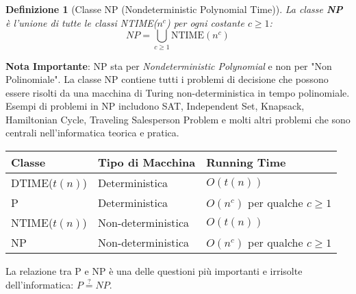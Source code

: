 \documentclass[a4paper]{article}
\newtheorem{definition}{Definizione}[section]
\begin{document}
\begin{definition}[Classe NP (Nondeterministic Polynomial Time)]
La classe \textbf{NP} è l'unione di tutte le classi NTIME($n^c$) per ogni costante $c \ge 1$:
\[ NP = \bigcup_{c \ge 1} \text{NTIME}(n^c) \]
\end{definition}
\textbf{Nota Importante}: NP sta per \emph{Nondeterministic Polynomial} e non per "Non Polinomiale". La classe NP contiene tutti i problemi di decisione che possono essere risolti da una macchina di Turing non-deterministica in tempo polinomiale.
Esempi di problemi in NP includono SAT, Independent Set, Knapsack, Hamiltonian Cycle, Traveling Salesperson Problem e molti altri problemi che sono centrali nell'informatica teorica e pratica.

\begin{center}
\begin{tabular}{|l|l|l|}
\hline
\textbf{Classe} & \textbf{Tipo di Macchina} & \textbf{Running Time} \\
\hline
DTIME($t(n)$) & Deterministica & $O(t(n))$ \\
P & Deterministica & $O(n^c)$ per qualche $c \ge 1$ \\
NTIME($t(n)$) & Non-deterministica & $O(t(n))$ \\
NP & Non-deterministica & $O(n^c)$ per qualche $c \ge 1$ \\
\hline
\end{tabular}
\end{center}

La relazione tra P e NP è una delle questioni più importanti e irrisolte dell'informatica: $P \stackrel{?}{=} NP$.
\end{document}
